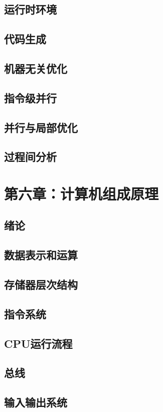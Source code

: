 \documentclass[UTF8]{article}
\begin{document}
        \subsection{运行时环境}
        \subsection{代码生成}
        \subsection{机器无关优化}
        \subsection{指令级并行}
        \subsection{并行与局部优化}
        \subsection{过程间分析}
    \newpage
    \section{第六章：计算机组成原理}
        \subsection{绪论}
        \subsection{数据表示和运算}
        \subsection{存储器层次结构}
        \subsection{指令系统}
        \subsection{CPU运行流程}
        \subsection{总线}
        \subsection{输入输出系统}
    \newpage
\end{document}
